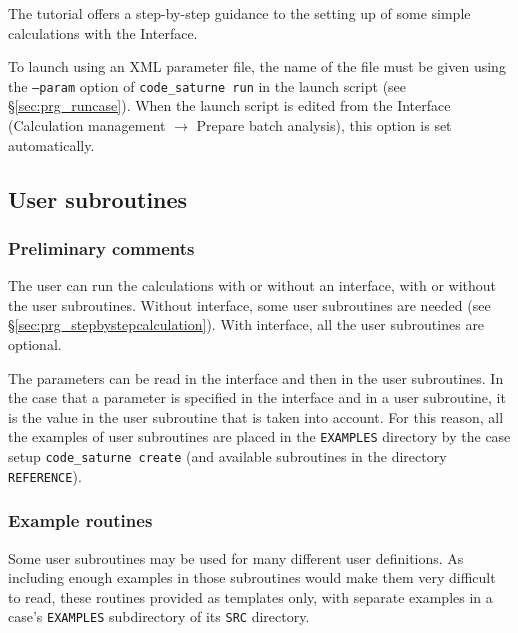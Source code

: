 {{{\begin{list}{-}{}
\end{list}

The \CS tutorial \cite{tutorial} offers a step-by-step guidance to the setting
up of some simple calculations with the \CS Interface.

To launch \CS using an XML parameter file,
the name of the file must
be given using the \texttt{--param} option of \texttt{code\_saturne run} in
the launch script (see \S\ref{sec:prg_runcase}). When the launch
script is edited from the Interface (Calculation management $\rightarrow$
Prepare batch analysis), this option is set automatically.

\subsection{User subroutines}
\label{sec:prg_ssprgutilis}
\subsubsection{Preliminary comments}

The user can run the calculations with or without an interface, with or
 without the user subroutines. Without interface, some user subroutines
 are needed (see \S\ref{sec:prg_stepbystepcalculation}). With interface,
all the user subroutines are optional.

The parameters can be read in the interface and then in the user
subroutines. In the case that a parameter is specified in the interface
 and in a user subroutine, it is the value in the user subroutine that
 is taken into account. For this reason, all the examples of
 user subroutines are placed in the \texttt{EXAMPLES} directory by the
 case setup \texttt{code\_saturne~create} (and available subroutines in the
 directory \texttt{REFERENCE}).

\subsubsection{Example routines}

Some user subroutines may be used for many different user definitions. As
including enough examples in those subroutines would make them very
difficult to read, these routines provided as templates only, with
separate examples in a case's \texttt{EXAMPLES} subdirectory of its
\texttt{SRC} directory.

}}}
